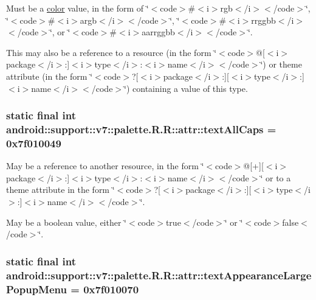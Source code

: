 Must be a \hyperlink{classandroid_1_1support_1_1v7_1_1palette_1_1_r_1_1color}{color} value, in the form of \char`\"{}$<$code$>$\#$<$i$>$rgb$<$/i$>$$<$/code$>$\char`\"{}, \char`\"{}$<$code$>$\#$<$i$>$argb$<$/i$>$$<$/code$>$\char`\"{}, \char`\"{}$<$code$>$\#$<$i$>$rrggbb$<$/i$>$$<$/code$>$\char`\"{}, or \char`\"{}$<$code$>$\#$<$i$>$aarrggbb$<$/i$>$$<$/code$>$\char`\"{}. 

This may also be a reference to a resource (in the form \char`\"{}$<$code$>$@\mbox{[}$<$i$>$package$<$/i$>$:\mbox{]}$<$i$>$type$<$/i$>$:$<$i$>$name$<$/i$>$$<$/code$>$\char`\"{}) or theme attribute (in the form \char`\"{}$<$code$>$?\mbox{[}$<$i$>$package$<$/i$>$:\mbox{]}\mbox{[}$<$i$>$type$<$/i$>$:\mbox{]}$<$i$>$name$<$/i$>$$<$/code$>$\char`\"{}) containing a value of this type. \hypertarget{classandroid_1_1support_1_1v7_1_1palette_1_1_r_1_1attr_0188970906288c74666161f85c57838f}{
\subsubsection[{textAllCaps}]{\setlength{\rightskip}{0pt plus 5cm}static final int android::support::v7::palette.R.R::attr::textAllCaps = 0x7f010049}}
\label{classandroid_1_1support_1_1v7_1_1palette_1_1_r_1_1attr_0188970906288c74666161f85c57838f}


May be a reference to another resource, in the form \char`\"{}$<$code$>$@\mbox{[}+\mbox{]}\mbox{[}$<$i$>$package$<$/i$>$:\mbox{]}$<$i$>$type$<$/i$>$:$<$i$>$name$<$/i$>$$<$/code$>$\char`\"{} or to a theme attribute in the form \char`\"{}$<$code$>$?\mbox{[}$<$i$>$package$<$/i$>$:\mbox{]}\mbox{[}$<$i$>$type$<$/i$>$:\mbox{]}$<$i$>$name$<$/i$>$$<$/code$>$\char`\"{}. 

May be a boolean value, either \char`\"{}$<$code$>$true$<$/code$>$\char`\"{} or \char`\"{}$<$code$>$false$<$/code$>$\char`\"{}. \hypertarget{classandroid_1_1support_1_1v7_1_1palette_1_1_r_1_1attr_22fc1075fb77d692099ca88c9eecee52}{
\subsubsection[{textAppearanceLargePopupMenu}]{\setlength{\rightskip}{0pt plus 5cm}static final int android::support::v7::palette.R.R::attr::textAppearanceLargePopupMenu = 0x7f010070}}
\label{classandroid_1_1support_1_1v7_1_1palette_1_1_r_1_1attr_22fc1075fb77d692099ca88c9eecee52}



